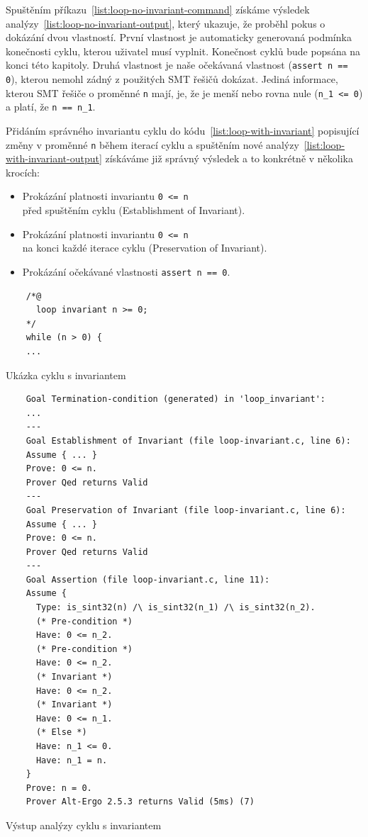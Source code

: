 Spuštěním příkazu~\ref{list:loop-no-invariant-command} získáme výsledek analýzy~\ref{list:loop-no-invariant-output},
který ukazuje, že proběhl pokus o dokázání dvou vlastností.
První vlastnost je automaticky generovaná podmínka konečnosti cyklu, kterou uživatel musí vyplnit.
Konečnost cyklů bude popsána na konci této kapitoly.
Druhá vlastnost je naše očekávaná vlastnost (\texttt{assert n == 0}),
kterou nemohl zádný z použitých SMT řešičů dokázat.
Jediná informace, kterou SMT řešiče o proměnné \texttt{n} mají,
je, že je menší nebo rovna nule (\texttt{n\_1 <= 0}) a platí, že \texttt{n == n\_1}.


Přidáním správného invariantu cyklu do kódu~\ref{list:loop-with-invariant}
popisující změny v proměnné \texttt{n} během iterací cyklu
a spuštěním nové analýzy~\ref{list:loop-with-invariant-output}
získáváme již správný výsledek a to konkrétně v několika krocích:

\begin{itemize}
    \item Prokázání platnosti invariantu \texttt{0 <= n} \\
          před spuštěním cyklu (Establishment of Invariant).
    \item Prokázání platnosti invariantu \texttt{0 <= n} \\
          na konci každé iterace cyklu (Preservation of Invariant).
    \item Prokázání očekávané vlastnosti \texttt{assert n == 0}.
\end{itemize}

\begin{listing}[H]
    \begin{verbatim}
    /*@
      loop invariant n >= 0;
    */
    while (n > 0) {
    ...
    \end{verbatim}
    \caption{Ukázka cyklu s invariantem}
    \label{list:loop-with-invariant}
\end{listing}

\begin{listing}[H]
    \begin{verbatim}
    Goal Termination-condition (generated) in 'loop_invariant':
    ...
    ---
    Goal Establishment of Invariant (file loop-invariant.c, line 6):
    Assume { ... }
    Prove: 0 <= n.
    Prover Qed returns Valid
    ---
    Goal Preservation of Invariant (file loop-invariant.c, line 6):
    Assume { ... }
    Prove: 0 <= n.
    Prover Qed returns Valid
    ---
    Goal Assertion (file loop-invariant.c, line 11):
    Assume {
      Type: is_sint32(n) /\ is_sint32(n_1) /\ is_sint32(n_2).
      (* Pre-condition *)
      Have: 0 <= n_2.
      (* Pre-condition *)
      Have: 0 <= n_2.
      (* Invariant *)
      Have: 0 <= n_2.
      (* Invariant *)
      Have: 0 <= n_1.
      (* Else *)
      Have: n_1 <= 0.
      Have: n_1 = n.
    }
    Prove: n = 0.
    Prover Alt-Ergo 2.5.3 returns Valid (5ms) (7)
    \end{verbatim}
    \caption{Výstup analýzy cyklu s invariantem}
    \label{list:loop-with-invariant-output}
\end{listing}

